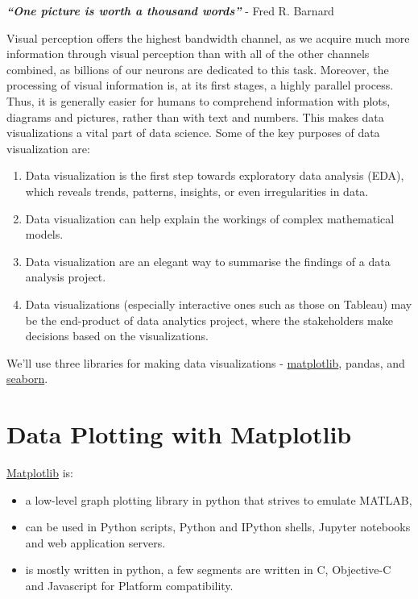 \documentclass[
  letterpaper,
  DIV=11,
  numbers=noendperiod]{scrreprt}
\providecommand{\tightlist}{%
  \setlength{\itemsep}{0pt}\setlength{\parskip}{0pt}}\usepackage{longtable,booktabs,array}
\begin{document}
\textbf{\emph{``One picture is worth a thousand words''}} - Fred R.
Barnard

Visual perception offers the highest bandwidth channel, as we acquire
much more information through visual perception than with all of the
other channels combined, as billions of our neurons are dedicated to
this task. Moreover, the processing of visual information is, at its
first stages, a highly parallel process. Thus, it is generally easier
for humans to comprehend information with plots, diagrams and pictures,
rather than with text and numbers. This makes data visualizations a
vital part of data science. Some of the key purposes of data
visualization are:

\begin{enumerate}
\def\labelenumi{\arabic{enumi}.}
\tightlist
\item
  Data visualization is the first step towards exploratory data analysis
  (EDA), which reveals trends, patterns, insights, or even
  irregularities in data.
\item
  Data visualization can help explain the workings of complex
  mathematical models.
\item
  Data visualization are an elegant way to summarise the findings of a
  data analysis project.
\item
  Data visualizations (especially interactive ones such as those on
  Tableau) may be the end-product of data analytics project, where the
  stakeholders make decisions based on the visualizations.
\end{enumerate}

We'll use three libraries for making data visualizations -
\href{https://matplotlib.org/}{matplotlib}, pandas, and
\href{https://seaborn.pydata.org/}{seaborn}.

\hypertarget{data-plotting-with-matplotlib}{%
\section{Data Plotting with
Matplotlib}\label{data-plotting-with-matplotlib}}

\href{https://matplotlib.org/}{Matplotlib} is:

\begin{itemize}
\tightlist
\item
  a low-level graph plotting library in python that strives to emulate
  MATLAB,
\item
  can be used in Python scripts, Python and IPython shells, Jupyter
  notebooks and web application servers.
\item
  is mostly written in python, a few segments are written in C,
  Objective-C and Javascript for Platform compatibility.
\end{itemize}
\end{document}
